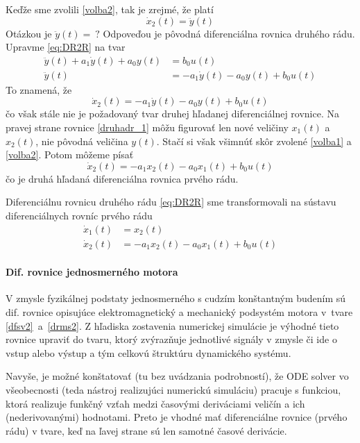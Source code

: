 \documentclass[a4paper, 10pt, ]{article}
\begin{document}
Keďže sme zvolili \eqref{volba2}, tak je zrejmé, že platí
\begin{equation} 
    \dot x_2(t) = \ddot y(t)
\end{equation}
Otázkou je $\ddot y(t) = \ ?$ Odpoveďou je pôvodná diferenciálna rovnica druhého rádu. Upravme \eqref{eq:DR2R} na tvar
\begin{align}
    \ddot y(t) + a_1 \dot y(t) + a_0 y(t) &= b_0 u(t) \\
    \ddot y(t) &= - a_1 \dot y(t) - a_0 y(t) +  b_0 u(t) 
\end{align}
To znamená, že
\begin{equation}  \label{druhadr_1}
    \dot x_2(t) = - a_1 \dot y(t) - a_0 y(t) +  b_0 u(t) 
\end{equation}
čo však stále nie je požadovaný tvar druhej hľadanej diferenciálnej rovnice. Na pravej strane rovnice \eqref{druhadr_1} môžu figurovať len nové veličiny $x_1(t)$ a $x_2(t)$, nie pôvodná veličina $y(t)$. Stačí si však všimnúť skôr zvolené \eqref{volba1} a \eqref{volba2}. Potom môžeme písať
\begin{equation}  \label{druhadr_2}
    \dot x_2(t) = - a_1  x_2(t) - a_0 x_1(t) +  b_0 u(t) 
\end{equation}
čo je druhá hľadaná diferenciálna rovnica prvého rádu.

Diferenciálnu rovnicu druhého rádu \eqref{eq:DR2R} sme transformovali na sústavu diferenciálnych rovníc prvého rádu
\begin{align}
    \dot x_1(t) &= x_2(t) \\
    \dot x_2(t) &= - a_1  x_2(t) - a_0 x_1(t) +  b_0 u(t) 
\end{align}


\paragraph{Dif. rovnice jednosmerného motora}

V zmysle fyzikálnej podstaty jednosmerného s cudzím konštantným budením sú dif. rovnice opisujúce elektromagnetický a mechanický podsystém motora v~tvare \eqref{dfsv2}~a~\eqref{drms2}. Z hľadiska zostavenia numerickej simulácie je výhodné tieto rovnice upraviť do tvaru, ktorý zvýrazňuje jednotlivé signály v zmysle či ide o vstup alebo výstup a tým celkovú štruktúru dynamického systému. 

Navyše, je možné konštatovať (tu bez uvádzania podrobností), že ODE solver vo všeobecnosti (teda nástroj realizujúci numerickú simuláciu) pracuje s funkciou, ktorá realizuje funkčný vzťah medzi časovými deriváciami veličín a ich (nederivovanými) hodnotami. Preto je vhodné mať diferenciálne rovnice (prvého rádu) v tvare, keď na ľavej strane sú len samotné časové derivácie.
\end{document}
